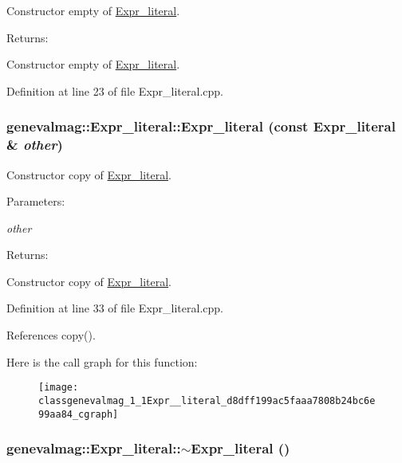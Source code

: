 Constructor empty of \hyperlink{classgenevalmag_1_1Expr__literal}{Expr\_\-literal}. \begin{Desc}
\item[Returns:]\end{Desc}
Constructor empty of \hyperlink{classgenevalmag_1_1Expr__literal}{Expr\_\-literal}. 

Definition at line 23 of file Expr\_\-literal.cpp.\hypertarget{classgenevalmag_1_1Expr__literal_d8dff199ac5faaa7808b24bc6e99aa84}{
\subsubsection[{Expr\_\-literal}]{\setlength{\rightskip}{0pt plus 5cm}genevalmag::Expr\_\-literal::Expr\_\-literal (const {\bf Expr\_\-literal} \& {\em other})}}
\label{classgenevalmag_1_1Expr__literal_d8dff199ac5faaa7808b24bc6e99aa84}


Constructor copy of \hyperlink{classgenevalmag_1_1Expr__literal}{Expr\_\-literal}. \begin{Desc}
\item[Parameters:]
\begin{description}
\item[{\em other}]\end{description}
\end{Desc}
\begin{Desc}
\item[Returns:]\end{Desc}
Constructor copy of \hyperlink{classgenevalmag_1_1Expr__literal}{Expr\_\-literal}. 

Definition at line 33 of file Expr\_\-literal.cpp.

References copy().

Here is the call graph for this function:\nopagebreak
\begin{figure}[H]
\begin{center}
\leavevmode
\texttt{[image: classgenevalmag\_1\_1Expr\_\_literal\_d8dff199ac5faaa7808b24bc6e99aa84\_cgraph]}
\end{center}
\end{figure}
\hypertarget{classgenevalmag_1_1Expr__literal_faa929f1cd65a7486a29e4d110c73f89}{
\subsubsection[{$\sim$Expr\_\-literal}]{\setlength{\rightskip}{0pt plus 5cm}genevalmag::Expr\_\-literal::$\sim$Expr\_\-literal ()}}
\label{classgenevalmag_1_1Expr__literal_faa929f1cd65a7486a29e4d110c73f89}


